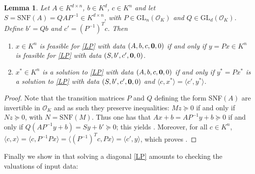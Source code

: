 \documentclass{elsarticle}
\theoremstyle{plain}
\newtheorem{lemma}[theorem]{Lemma}
\theoremstyle{definition}
\newcommand{\OK}{\mathcal{O}_K}
\newcommand{\GL}{\mathrm{GL}}
\begin{document}
\begin{lemma} \label{solsLP}
  Let $A \in K^{d\times n}$, $b \in K^d$, $c\in K^n$ and let
  $S = \mathrm{SNF}(A) = QAP^{-1} \in K^{d\times n}$, with
  $P \in \GL_n(\OK)$ and $Q\in \GL_d(\OK)$.
  Define $b' = Qb$ and $c' = (P^{-1})^Tc$.
  Then
   \begin{enumerate}
   \item \label{solsLP_item1}
     $x \in K^n$ is feasible for \eqref{LP} with data $(A,b,c,{\bf 0},0)$ if and only if $y = P x \in K^n$ is
     feasible for \eqref{LP} with data $(S,b',c',{\bf 0},0)$.
   \item \label{solsLP_item2}
     $x^* \in K^n$ is a solution to \eqref{LP} with data $(A,b,c,{\bf 0},0)$ if and only if $y^* = P x^*$ is
     a solution to \eqref{LP} with data $(S,b',c',{\bf 0},0)$ and $\langle c,x^* \rangle = \langle c',y^* \rangle$.
   \end{enumerate}
\end{lemma}
\begin{proof}
  Note that the transition matrices $P$ and $Q$ defining the form SNF$(A)$ are invertible in $\OK$
  and as such they preserve inequalities: $Mz \succeq 0$ if and only if $Nz \succeq 0$, with
  $N = \mathrm{SNF}(M)$. Thus one has that $Ax+b = AP^{-1}y +b \succeq 0$ if and only if
  $Q(AP^{-1}y + b) = Sy + b' \succeq 0$; this yields .
  Moreover, for all $c \in K^n$, $\langle c, x\rangle = \langle c, P^{-1}Px \rangle =
  \langle (P^{-1})^T c, Px \rangle = \langle c',y\rangle$, which proves
  .
\end{proof}

Finally we show in  that solving a diagonal \eqref{LP} amounts
to checking the valuations of input data:
\end{document}
